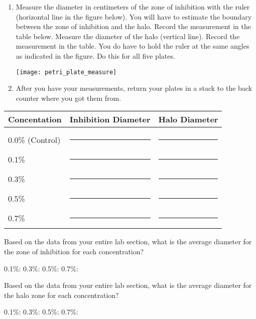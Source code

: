 \documentclass[12pt]{exam}
\begin{document}
\begin{questions}
\begin{enumerate}
	\item Measure the diameter in centimeters of the zone of inhibition with the ruler (horizontal line in the figure below). You will have to estimate the boundary between the zone of inhibition and the halo. Record the measurement in the table below. Measure the diameter of the halo (vertical line). Record the measurement in the table. You do have to hold the ruler at the same angles as indicated in the figure. Do this for all five plates.

		{\centering\texttt{[image: petri\_plate\_measure]}\par
		}

	\item After you have your measurements, return your plates in a stack to the back counter where you got them from.
	
\end{enumerate}

\begin{longtable}[c]{lcc}
	\toprule
		Concentation	&	Inhibition Diameter	&	Halo Diameter \tabularnewline
	\midrule
		& & \tabularnewline[0.75em]
		0.0\% (Control)	& \rule{0.75in}{0.4pt} & \rule{0.75in}{0.4pt} \tabularnewline[2em]
		0.1\%	& \rule{0.75in}{0.4pt} & \rule{0.75in}{0.4pt} \tabularnewline[2em]
		0.3\%	& \rule{0.75in}{0.4pt} & \rule{0.75in}{0.4pt} \tabularnewline[2em]
		0.5\%	& \rule{0.75in}{0.4pt} & \rule{0.75in}{0.4pt} \tabularnewline[2em]
		0.7\%	& \rule{0.75in}{0.4pt} & \rule{0.75in}{0.4pt} \tabularnewline
	\bottomrule
\end{longtable}

\question \label{ques:zoi}
Based on the data from your entire lab section, what is the average diameter for the zone of inhibition for each concentration?

\vspace*{0.5\baselineskip}

0.1\%: \hfill 0.3\%: \hfill 0.5\%: \hfill 0.7\%: \hfill \phantom{|}

\vspace{0.5\baselineskip}

\question \label{ques:halo}
Based on the data from your entire lab section, what is the average diameter for the halo zone for each concentration?

\vspace*{0.5\baselineskip}

0.1\%: \hfill 0.3\%: \hfill 0.5\%: \hfill 0.7\%: \hfill \phantom{|}

\vspace{0.5\baselineskip}



\end{questions}
\end{document}
